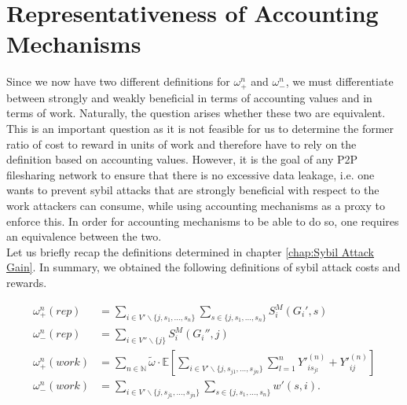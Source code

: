 \chapter{Representativeness of Accounting Mechanisms}
\label{chap:Representativeness of Accounting Mechanisms}
\noindent{}Since we now have two different definitions for $\omega^n_{+}$ and $\omega^n_{-}$, we must differentiate between strongly and weakly beneficial in terms of accounting values and in terms of work. Naturally, the question arises whether these two are equivalent. This is an important question as it is not feasible for us to determine the former ratio of cost to reward in units of work and therefore have to rely on the definition based on accounting values. However, it is the goal of any P2P filesharing network to ensure that there is no excessive data leakage, i.e. one wants to prevent sybil attacks that are strongly beneficial with respect to the work attackers can consume, while using accounting mechanisms as a proxy to enforce this. In order for accounting mechanisms to be able to do so, one requires an equivalence between the two. \vspace{1em}\\

\noindent{}Let us briefly recap the definitions determined in chapter \ref{chap:Sybil Attack Gain}. In summary, we obtained the following definitions of sybil attack costs and rewards.

\begin{align*}
\omega_{+}^{n}(rep) &= \sum\limits_{i\in{}V'\backslash\lbrace{}j,s_1,\ldots,s_n\rbrace}\sum\limits_{s\in\lbrace{}j,s_1,\ldots,s_n\rbrace}S^M_i(G_i',s)\\
\omega_{-}^{n}(rep) &= \sum_{i\in{}V''\backslash\lbrace{}j\rbrace}S^M_i(G_i'',j)\\
\omega_{+}^{n}(work) &= \sum\limits_{n\in\mathbb{N}}\tilde{\omega}\cdot\mathbb{E}\left[\sum\limits_{i\in{}V'\backslash\lbrace{}j,s_{j1},\ldots,s_{jn}\rbrace}\sum\limits_{l=1}^{n}Y'^{(n)}_{is_{jl}} + Y'^{(n)}_{ij}\right]\\
\omega_{-}^{n}(work) &= \sum\limits_{i\in{}V'\backslash\lbrace{}j,s_{j1},\ldots,s_{jn}\rbrace}\sum\limits_{s\in\lbrace{}j,s_1,\ldots,s_n\rbrace}w'(s,i).
\end{align*}



